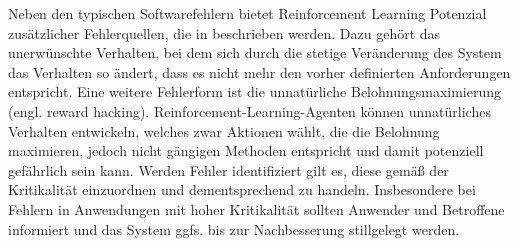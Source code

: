 Neben den typischen Softwarefehlern bietet Reinforcement Learning Potenzial zusätzlicher Fehlerquellen, die in \cite[S. 3]{amodei2016} beschrieben werden.
Dazu gehört das unerwünschte Verhalten, bei dem sich durch die stetige Veränderung des System das Verhalten so ändert, dass es nicht mehr den vorher definierten Anforderungen entspricht.
Eine weitere Fehlerform ist die unnatürliche Belohnungsmaximierung (engl. reward hacking).
Reinforcement-Learning-Agenten können unnatürliches Verhalten entwickeln, welches zwar Aktionen wählt, die die Belohnung maximieren, jedoch nicht gängigen Methoden entspricht und damit potenziell gefährlich sein kann.
\ab
Werden Fehler identifiziert gilt es, diese gemäß der Kritikalität einzuordnen und dementsprechend zu handeln.
Insbesondere bei Fehlern in Anwendungen mit hoher Kritikalität sollten Anwender und Betroffene informiert und das System ggfs. bis zur Nachbesserung stillgelegt werden.